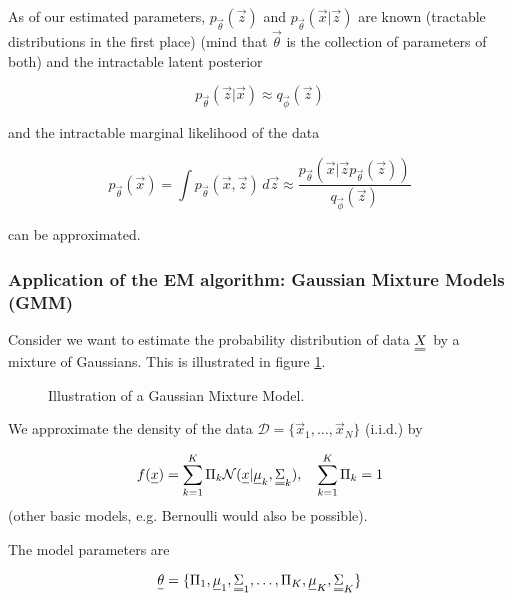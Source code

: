 As of our estimated parameters, $p_\vec{\theta}(\vec{z})$ and $p_\vec{\theta}(\vec{x} | \vec{z})$ are known
(tractable distributions in the first place) (mind that $\vec{\theta}$ is the collection
of parameters of both) and the intractable latent posterior

\begin{equation}
    p_\vec{\theta}(\vec{z} | \vec{x}) \approx q_{\vec{\phi}}(\vec{z})
\end{equation}

and the intractable marginal likelihood of the data

\begin{equation}
    p_\vec{\theta}(\vec{x}) = \int p_\vec{\theta}(\vec{x}, \vec{z}) \, d\vec{z} \approx \frac{p_\vec{\theta}(\vec{x}|\vec{z} p_\vec{\theta}(\vec{z}))}{q_\vec{\phi}(\vec{z})}
\end{equation}

can be approximated.

\subsubsection{Application of the EM algorithm: Gaussian Mixture Models (GMM)}
Consider we want to estimate the probability distribution of data $\mat{X}$ by 
a mixture of Gaussians. This is illustrated in figure \ref{fig:gmm}.


\begin{figure}[!htb]
    \centering
    
    \caption{Illustration of a Gaussian Mixture Model.}
    \label{fig:gmm}
\end{figure}

We approximate the density of the data $\mathcal{D} = \{ \vec{x}_1, \dots, \vec{x}_N \}$ (i.i.d.) by

\begin{equation}
    f(\vec{x}) = \sum_{k=1}^{K} \Pi_k \mathcal{N}(\vec{x} | \vec{\mu}_k, \mat{\Sigma}_k), \quad \sum_{k=1}^{K} \Pi_k = 1
\end{equation}
(other basic models, e.g. Bernoulli would also be possible).

The model parameters are

\begin{equation}
    \vec{\theta} = \{ \Pi_1, \vec{\mu}_1, \mat{\Sigma}_1, \dots, \Pi_K, \vec{\mu}_K, \mat{\Sigma}_K \}
\end{equation}

